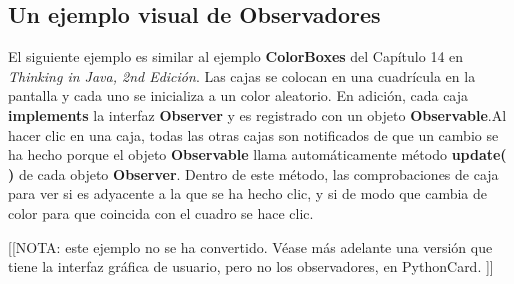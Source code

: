 \documentclass{article}
\begin{document}
\subsection{Un ejemplo visual de Observadores}

El siguiente ejemplo es similar al ejemplo \textbf{ColorBoxes}  del Capítulo 14 en \textit{Thinking in Java, 2nd Edición}. Las cajas se colocan en una cuadrícula en la pantalla y cada uno se inicializa a un color aleatorio. En adición, cada caja \textbf{implements} la interfaz \textbf{Observer} y es registrado con un objeto \textbf{Observable}.Al hacer clic en una caja, todas las otras cajas son notificados de que un cambio se ha hecho porque el objeto \textbf{Observable} llama automáticamente método \textbf{update( )} de cada objeto \textbf{Observer}.  Dentro de este método, las comprobaciones de caja para ver si es adyacente a la que se ha hecho clic, y si de modo que cambia de color para que coincida con el cuadro se hace clic.  \newline

[[NOTA: este ejemplo no se ha convertido. Véase más adelante una versión que tiene la interfaz gráfica de usuario, pero no los observadores, en PythonCard. ]]  \newline
\end{document}
